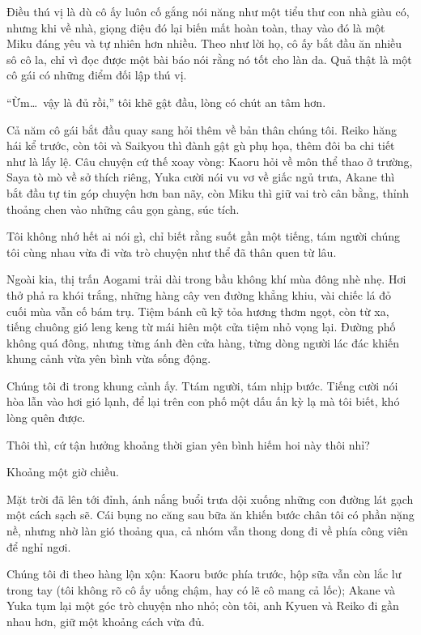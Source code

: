 \documentclass[../main.tex]{subfiles}
\begin{document}
Điều thú vị là dù cô ấy luôn cố gắng nói năng như một tiểu thư con nhà giàu có, nhưng khi về nhà, giọng điệu đó lại biến mất hoàn toàn, thay vào đó là một Miku đáng yêu và tự nhiên hơn nhiều. Theo như lời họ, cô ấy bắt đầu ăn nhiều sô cô la, chỉ vì đọc được một bài báo nói rằng nó tốt cho làn da. Quả thật là một cô gái có những điểm đối lập thú vị.

\chrint

``Ừm\dots\ vậy là đủ rồi,'' tôi khẽ gật đầu, lòng có chút an tâm hơn.

Cả năm cô gái bắt đầu quay sang hỏi thêm về bản thân chúng tôi. Reiko hăng hái kể trước, còn tôi và Saikyou thì đành gật gù phụ họa, thêm đôi ba chi tiết như là lấy lệ. Câu chuyện cứ thế xoay vòng: Kaoru hỏi về môn thể thao ở trường, Saya tò mò về sở thích riêng, Yuka cười nói vu vơ về giấc ngủ trưa, Akane thì bắt đầu tự tin góp chuyện hơn ban nãy, còn Miku thì giữ vai trò cân bằng, thỉnh thoảng chen vào những câu gọn gàng, súc tích.

Tôi không nhớ hết ai nói gì, chỉ biết rằng suốt gần một tiếng, tám người chúng tôi cùng nhau vừa đi vừa trò chuyện như thể đã thân quen từ lâu.

Ngoài kia, thị trấn Aogami trải dài trong bầu không khí mùa đông nhè nhẹ. Hơi thở phả ra khói trắng, những hàng cây ven đường khẳng khiu, vài chiếc lá đỏ cuối mùa vẫn cố bám trụ. Tiệm bánh cũ kỹ tỏa hương thơm ngọt, còn từ xa, tiếng chuông gió leng keng từ mái hiên một cửa tiệm nhỏ vọng lại. Đường phố không quá đông, nhưng từng ánh đèn cửa hàng, từng dòng người lác đác khiến khung cảnh vừa yên bình vừa sống động.

Chúng tôi đi trong khung cảnh ấy. Ttám người, tám nhịp bước. Tiếng cười nói hòa lẫn vào hơi gió lạnh, để lại trên con phố một dấu ấn kỳ lạ mà tôi biết, khó lòng quên được.

Thôi thì, cứ tận hưởng khoảng thời gian yên bình hiếm hoi này thôi nhỉ?


Khoảng một giờ chiều.

Mặt trời đã lên tới đỉnh, ánh nắng buổi trưa dội xuống những con đường lát gạch một cách sạch sẽ. Cái bụng no căng sau bữa ăn khiến bước chân tôi có phần nặng nề, nhưng nhờ làn gió thoảng qua, cả nhóm vẫn thong dong đi về phía công viên để nghỉ ngơi.

Chúng tôi đi theo hàng lộn xộn: Kaoru bước phía trước, hộp sữa vẫn còn lắc lư trong tay (tôi không rõ cô ấy uống chậm, hay có lẽ cô mang cả lốc); Akane và Yuka tụm lại một góc trò chuyện nho nhỏ; còn tôi, anh Kyuen và Reiko đi gần nhau hơn, giữ một khoảng cách vừa đủ.
\end{document}
